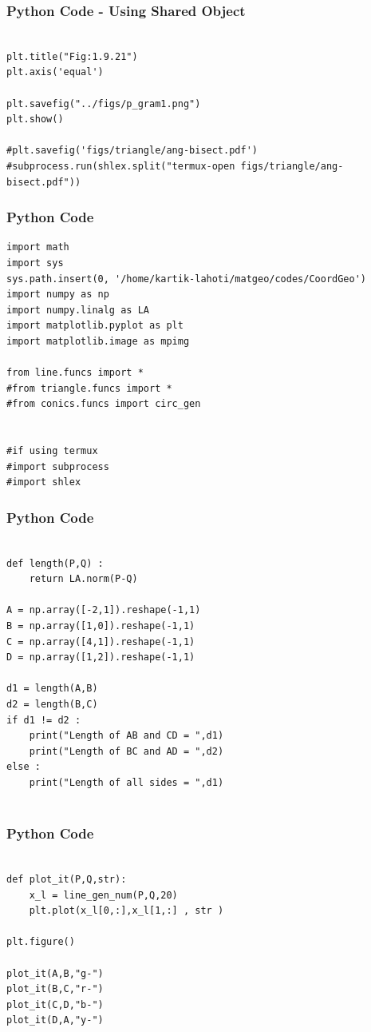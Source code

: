 \documentclass{beamer}
\begin{document}
\begin{frame}[fragile]
    \frametitle{Python Code - Using Shared Object}
    \begin{lstlisting}

plt.title("Fig:1.9.21")
plt.axis('equal')

plt.savefig("../figs/p_gram1.png")
plt.show()

#plt.savefig('figs/triangle/ang-bisect.pdf')
#subprocess.run(shlex.split("termux-open figs/triangle/ang-bisect.pdf"))

\end{lstlisting}
\end{frame}




\begin{frame}[fragile]
    \frametitle{Python Code}
    \begin{lstlisting}
import math
import sys 
sys.path.insert(0, '/home/kartik-lahoti/matgeo/codes/CoordGeo')
import numpy as np
import numpy.linalg as LA
import matplotlib.pyplot as plt
import matplotlib.image as mpimg

from line.funcs import *
#from triangle.funcs import *
#from conics.funcs import circ_gen


#if using termux
#import subprocess
#import shlex
\end{lstlisting}
\end{frame}

\begin{frame}[fragile]
    \frametitle{Python Code }
    \begin{lstlisting}

def length(P,Q) :
    return LA.norm(P-Q)

A = np.array([-2,1]).reshape(-1,1)
B = np.array([1,0]).reshape(-1,1)
C = np.array([4,1]).reshape(-1,1)
D = np.array([1,2]).reshape(-1,1)

d1 = length(A,B)
d2 = length(B,C)
if d1 != d2 :
    print("Length of AB and CD = ",d1)
    print("Length of BC and AD = ",d2)
else :
    print("Length of all sides = ",d1)


\end{lstlisting}
\end{frame}

\begin{frame}[fragile]
    \frametitle{Python Code }
    \begin{lstlisting}

def plot_it(P,Q,str):
    x_l = line_gen_num(P,Q,20)
    plt.plot(x_l[0,:],x_l[1,:] , str )

plt.figure()

plot_it(A,B,"g-")
plot_it(B,C,"r-")
plot_it(C,D,"b-")
plot_it(D,A,"y-")
\end{lstlisting}
\end{frame}
\end{document}

